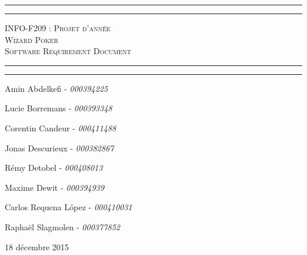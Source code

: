 \begin{titlepage}

\begin{center}
    \vspace*{\fill}
        \hrule
        \vspace*{2pt}
        \hrule
        \vspace*{15pt}
        \textsc{\Huge{INFO-F209 : Projet d'année \\\vspace*{8pt}
            Wizard Poker\\\vspace*{12pt}
            Software Requirement Document}}
        \vspace*{15pt}
        \hrule
        \vspace*{2pt}
        \hrule
  \vspace*{\fill}
\end{center}
\null
\vfill

\hfill Amin Abdelkefi - \emph{000394225}

\hfill Lucie Borremans - \emph{000393348}

\hfill Corentin Candeur - \emph{000411488}

\hfill Jonas Descurieux - \emph{000382867}

\hfill Rémy Detobel - \emph{000408013}

\hfill Maxime Dewit - \emph{000394939}

\hfill Carlos Requena López - \emph{000410031}

\hfill Raphaël Slagmolen - \emph{000377852}

\large 18 décembre 2015

\end{titlepage}
